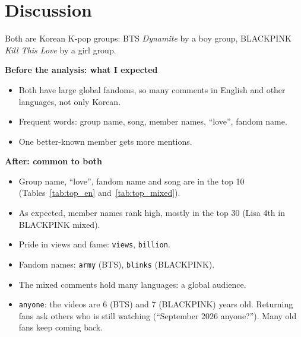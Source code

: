 \documentclass[11pt]{article}
\newcommand{\vidA}{\texorpdfstring{BTS \emph{Dynamite}}{BTS Dynamite}}
\newcommand{\vidB}{\texorpdfstring{BLACKPINK \emph{Kill This Love}}{BLACKPINK Kill This Love}}
\begin{document}
\clearpage
\section{Discussion}\label{sec:discussion}

Both are Korean K-pop groups: \vidA{} by a boy group, \vidB{} by a girl group.

\textbf{Before the analysis: what I expected}
\begin{itemize}
  \item Both have large global fandoms, so many comments in English and other languages, not only Korean.
  \item Frequent words: group name, song, member names, ``love'', fandom name.
  \item One better-known member gets more mentions.
\end{itemize}

\textbf{After: common to both}
\begin{itemize}
  \item Group name, ``love'', fandom name and song are in the top 10 (Tables~\ref{tab:top_en} and~\ref{tab:top_mixed}).
  \item As expected, member names rank high, mostly in the top 30 (Lisa 4th in BLACKPINK mixed).
  \item Pride in views and fame: \texttt{views}, \texttt{billion}.
  \item Fandom names: \texttt{army} (BTS), \texttt{blinks} (BLACKPINK).
  \item The mixed comments hold many languages: a global audience.
  \item \texttt{anyone}: the videos are 6 (BTS) and 7 (BLACKPINK) years old. Returning fans ask others who is still watching (``September 2026 anyone?''). Many old fans keep coming back.
\end{itemize}
\end{document}
